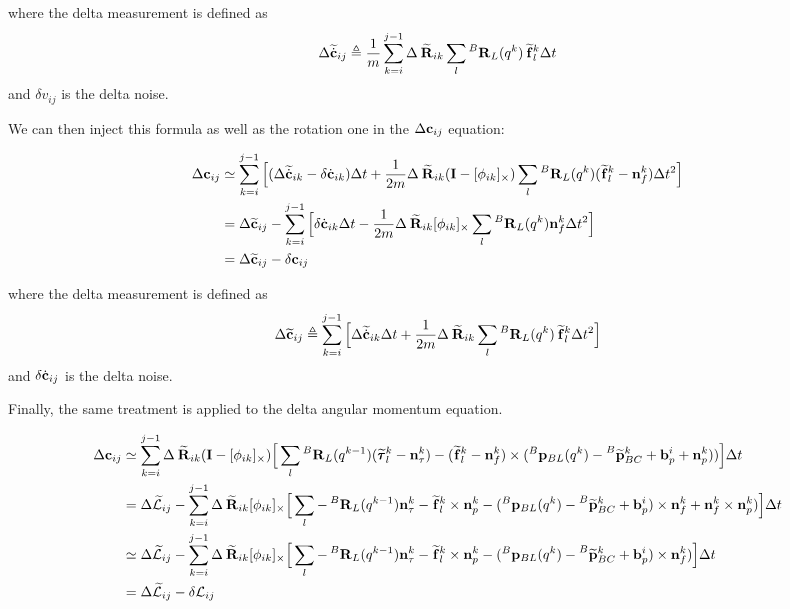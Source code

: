 \documentclass[11pt]{article}
\newcommand{\Rot}[2]{\prescript{#1}{}{\bfR}_{#2}}
\newcommand{\Rotm}[2]{\prescript{#1}{}{\widetilde{\bfR}}_{#2}}
\newcommand{\noise}{\bfn}
\newcommand{\bias}{\bfb}
\newcommand{\posi}[2]{\prescript{#1}{}{\bfp}_{#2}}
\newcommand{\posim}[2]{\prescript{#1}{}{\widetilde{\bfp}}_{#2}}
\newcommand{\forcem}[2]{\prescript{#1}{}{\widetilde{\bff}}_{#2}}
\newcommand{\torquem}[2]{\prescript{#1}{}{\widetilde{\pmb{\tau}}}_{#2}}
\newcommand{\AM}{\mathcal{L}}
\newcommand{\AMm}{\widetilde{\mathcal{L}}}
\newcommand{\COM}{\bfc}
\newcommand{\COMm}{\widetilde{\bfc}}
\newcommand{\COMd}{\dot{\bfc}}
\newcommand{\COMdm}{\widetilde{\dot{\bfc}}}
\newcommand{\Ident}{\bfI}
\begin{document}
where the delta measurement is defined as
\begin{equation}
    \Delta \COMdm_{ij} \triangleq \frac{1}{m} \sum_{k=i}^{j-1} \Delta \Rotm{}{ik} \sum_l \Rot{B}{L}(q^{k}) \forcem{}{l}^{k}\Delta t
\end{equation}
 and $\delta v_{ij}$ is the delta noise.

We can then inject this formula as well as the rotation one in the $\Delta \COM_{ij}$ equation:

\begin{equation}
\begin{split}
\Delta \COM_{ij} &\simeq
\sum_{k=i}^{j-1} \Big[ (\Delta \COMdm_{ik} - \delta \COMd_{ik}) \Delta t + \frac{1}{2m} \Delta \Rotm{}{ik}(\Ident - [\phi_{ik}]_{\times}) \sum_l \Rot{B}{L}(q^{k}) (\forcem{}{l}^{k} - \noise_f^{k}) \Delta t^2 \Big]
\\
&= \Delta \COMm_{ij} - \sum_{k=i}^{j-1} \Big[ \delta \COMd_{ik} \Delta t - \frac{1}{2m} \Delta \Rotm{}{ik}[\phi_{ik}]_{\times} \sum_l \Rot{B}{L}(q^{k}) \noise_f^{k} \Delta t^2 \Big]
\\
&= \Delta \COMm_{ij} - \delta \COM_{ij}
\end{split}
\end{equation}

where the delta measurement is defined as
\begin{equation}
    \Delta \COMm_{ij} \triangleq 
    \sum_{k=i}^{j-1} \Big[\Delta \COMdm_{ik} \Delta t + \frac{1}{2m} \Delta \Rotm{}{ik} \sum_l \Rot{B}{L}(q^{k}) \forcem{}{l}^{k} \Delta t^2 \Big]
\end{equation}
 and $\delta \COMd_{ij}$ is the delta noise.

Finally, the same treatment is applied to the delta angular momentum equation.

\begin{equation}
\begin{split}
\Delta \COM_{ij} &\simeq
\sum_{k=i}^{j-1} \Delta \Rotm{}{ik}(\Ident - [\phi_{ik}]_{\times}) \Big[ 
\sum_l \Rot{B}{L}(q^{k-1}) (\torquem{}{l}^{k} - \noise_{\tau}^{k}) - (\forcem{}{l}^{k} - \noise_f^{k}) \times (\posi{B}{BL}(q^k) - \posim{B}{BC}^k + \bias_{p}^i + \noise_p^k)) \Big]  \Delta t
\\
&= \Delta \AMm_{ij} -\sum_{k=i}^{j-1} \Delta \Rotm{}{ik}[\phi_{ik}]_{\times} \Big[ 
\sum_l - \Rot{B}{L}(q^{k-1}) \noise_{\tau}^{k} - %
\forcem{}{l}^{k} \times \noise_p^k - (\posi{B}{BL}(q^k) - \posim{B}{BC}^k + \bias_{p}^i) \times \noise_f^{k} + \noise_f^{k} \times \noise_p^k) \Big]  \Delta t
\\
&\simeq \Delta \AMm_{ij} -\sum_{k=i}^{j-1} \Delta \Rotm{}{ik}[\phi_{ik}]_{\times} \Big[ 
\sum_l - \Rot{B}{L}(q^{k-1}) \noise_{\tau}^{k} -
\forcem{}{l}^{k} \times \noise_p^k - (\posi{B}{BL}(q^k) - \posim{B}{BC}^k + \bias_{p}^i) \times \noise_f^{k}) \Big]  \Delta t
\\
&= \Delta \AMm_{ij} - \delta \AM_{ij}
\end{split}
\end{equation}
\end{document}
